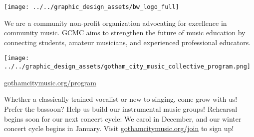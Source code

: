 \documentclass{article}[10pt]
\newcommand{\logo}{
        {\texttt{[image: ../../graphic\_design\_assets/bw\_logo\_full]}}
}
\newcommand{\tunedspace}{\vspace{0.15in}}
\begin{document}
    \begin{center}
    {\logo}

        \tunedspace

        \begin{minipage}{4in}


            \begin{small}
                We are a community non-profit organization advocating for excellence in community music.
                GCMC aims to strengthen the future of music education by connecting students, amateur musicians, and experienced professional educators.
            \end{small}

            \begin{center}
            {\textbf{}}

                \vspace{0.1in}

                {\texttt{[image: ../../graphic\_design\_assets/gotham\_city\_music\_collective\_program.png]}}

                \href{https://gothamcitymusic.org/program}{gothamcitymusic.org/program}
            \end{center}

            \begin{center}
            {\textbf{}}
            \end{center}

            \vspace{-0.1in}

            \begin{small}
                Whether a classically trained vocalist or new to singing, come grow with us!
                Prefer the bassoon?
                Help us build our instrumental music groups!
                Rehearsal begins soon for our next concert cycle:
                We carol in December, and our winter concert cycle begins in January.
                Visit {\href{gothamcitymusic.org/join}{gothamcitymusic.org/join}} to sign up!
            \end{small}

            \begin{center}
            {\textbf{}}
            \end{center}

            \vspace{-0.1in}


\end{minipage}
\end{center}
\end{document}
